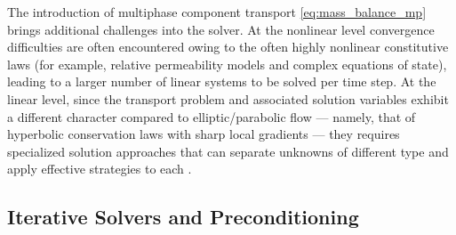 The introduction of multiphase component transport \cref{eq:mass_balance_mp} brings additional challenges into the solver.   At the nonlinear level convergence difficulties are often encountered owing to the often highly nonlinear constitutive laws (for example, relative permeability models and complex equations of state), leading to a larger number of linear systems to be solved per time step.   At the linear level, since the transport problem and associated solution variables exhibit a different character compared to elliptic/parabolic flow --- namely, that of hyperbolic conservation laws with sharp local gradients --- they requires specialized solution approaches that can separate unknowns of different type and apply effective strategies to each \cite{Wallis1983,Kwok2007,Klevtsov2016,White2019}.

\subsection{Iterative Solvers and Preconditioning}
\label{subsec:intro_problem_preconditioning}


